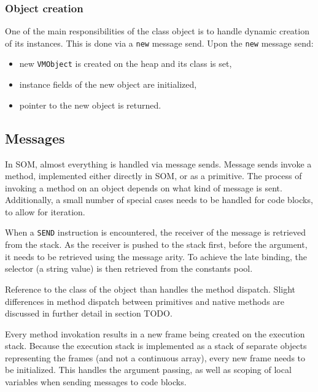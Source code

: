 \documentclass[thesis=M,english]{FITthesis}[2019/12/23]
\begin{document}
\subsubsection{Object creation}
One of the main responsibilities of the class object is to handle dynamic creation of its instances. This is done via a \texttt{new} message send.
Upon the \texttt{new} message send:
\begin{itemize}
	\item new \texttt{VMObject} is created on the heap and its class is set,
	\item instance fields of the new object are initialized,
	\item pointer to the new object is returned.
\end{itemize}

\subsection{Messages}
In SOM, almost everything is handled via message sends. Message sends invoke a method, implemented either directly in SOM, or as a primitive.
The process of invoking a method on an object depends on what kind of message is sent. Additionally, a small number of special cases needs to
be handled for code blocks, to allow for iteration.

When a \texttt{SEND} instruction is encountered, the receiver of the message is retrieved from the stack. As the receiver is pushed to the stack
first, before the argument, it needs to be retrieved using the message arity. To achieve the late binding, the selector (a string value)
is then retrieved from the constants pool. 

Reference to the class of the object than handles the method dispatch. Slight differences in method dispatch between primitives and native
methods are discussed in further detail in section TODO.

Every method invokation results in a new frame being created on the execution stack. Because the execution stack is implemented as a
stack of separate objects representing the frames (and not a continuous array), every new frame needs to be initialized. This handles
the argument passing, as well as scoping of local variables when sending messages to code blocks.
\end{document}
